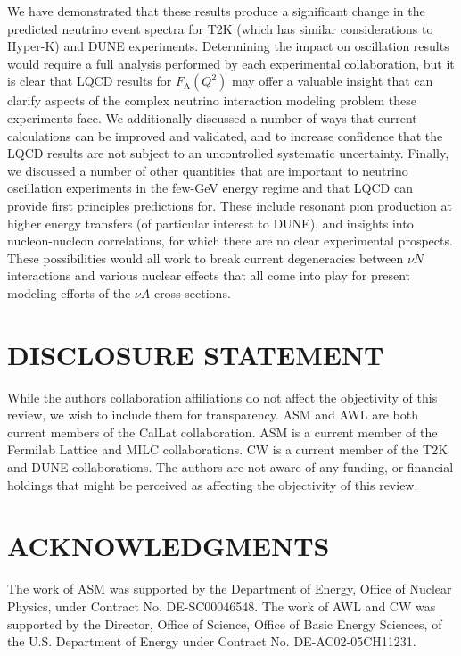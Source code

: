 \documentclass{ar-1col}
\begin{document}
We have demonstrated that these results produce a significant change in the predicted neutrino event spectra for T2K (which has similar considerations to Hyper-K) and DUNE experiments.
Determining the impact on oscillation results would require a full analysis performed by each experimental collaboration, but it is clear that LQCD results for $F_{\mathrm{A}}(Q^2)$ may offer a valuable insight that can clarify aspects of the complex neutrino interaction modeling problem these experiments face.
We additionally discussed a number of ways that current calculations can be improved and validated, and to increase confidence that the LQCD results are not subject to an uncontrolled systematic uncertainty.
Finally, we discussed a number of other quantities that are important to neutrino oscillation experiments in the few-GeV energy regime and that LQCD can provide first principles predictions for.
These include resonant pion production at higher energy transfers (of particular interest to DUNE), and insights into nucleon-nucleon correlations, for which there are no clear experimental prospects.
These possibilities would all work to break current degeneracies between $\nu N$ interactions and various nuclear effects that all come into play for present modeling efforts of the $\nu A$ cross sections.



\section*{DISCLOSURE STATEMENT}
While the authors collaboration affiliations do not affect the objectivity of this review, we wish to include them for transparency. ASM and AWL are both current members of the CalLat collaboration. ASM is a current member of the Fermilab Lattice and MILC collaborations. CW is a current member of the T2K and DUNE collaborations.
The authors are not aware of any funding, or financial holdings that might be perceived as affecting the objectivity of this review.

\section*{ACKNOWLEDGMENTS}
The work of ASM was supported by the Department of Energy, Office of Nuclear Physics, under Contract No. DE-SC00046548.
The work of AWL and CW was supported by the Director, Office of Science, Office of Basic Energy Sciences, of the U.S. Department of Energy under Contract No. DE-AC02-05CH11231.




\end{document}
